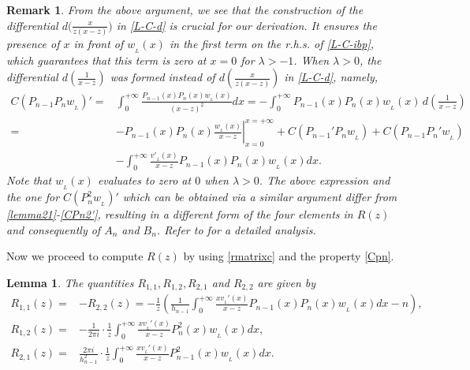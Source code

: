 \documentclass[12pt,a4paper]{article}    %
\newtheorem{lemma}[theorem]{Lemma}
\newtheorem{remark}{Remark}
\numberwithin{equation}{section}
\begin{document}
{\sloppy \begin{remark}\label{L-R2}
From the above argument, we see that the construction of  the differential $d\big(\frac{x}{z(x-z)}\big)$  in  \eqref{L-C-d} is crucial for our derivation. It ensures the presence of $x$ in front of $w_{_{L}}(x)$ in the first term on the r.h.s. of \eqref{L-C-ibp}, which guarantees that this term is zero at $x=0$ for $\lambda>-1$.
When $\lambda>0$, the differential $d\left(\frac{1}{x-z}\right)$ was formed \cite{WvA18} instead of $d\left(\frac{x}{z(x-z)}\right)$ in \eqref{L-C-d}, namely,
\begin{align*}
C\left(P_{n-1}P_nw_{_L}\right)'=&\int_{0}^{+\infty}\frac{P_{n-1}(x)P_{n}(x)w_{_L}(x)}{(x-z)^{2}}dx
=-\int_{0}^{+\infty}P_{n-1}(x)P_{n}(x)w_{_L}(x)\,d\left(\frac{1}{x-z}\right)\\
=&-\left.P_{n-1}(x)P_{n}(x)\frac{ w_{_L}(x)}{x-z}\right|_{x=0}^{x=+\infty}+ C(P_{n-1}'P_nw_{_L})+C(P_{n-1}P_n'w_{_L})\\
&-\int_0^{+\infty}\frac{v'_{_L}(x)}{x-z}P_{n-1}(x)P_n(x)w_{_L}(x)dx.
\end{align*}
Note that $w_{_L}(x)$ evaluates to zero at $0$ when $\lambda>0$. The above expression and the one for $C(P_{n}^{2}w_{_L})'$ which can be obtained via a similar argument differ from \eqref{lemma21}-\eqref{CPn2'}, resulting in a different form of the four elements in $R(z)$ and consequently of $A_n$ and $B_n$. Refer to \cite[Section 4.3]{WvA18} for a detailed analysis.
\end{remark}}	

Now we proceed to compute $R(z)$ by using \eqref{rmatrixc} and the property \eqref{Cpn}.
\begin{lemma}\label{R-L}
 The quantities $R_{1,1}, R_{1,2}, R_{2,1}$ and $ R_{2,2}$ are given by
	\begin{align}			 R_{1,1}(z)=&-R_{2,2}(z)=-\frac{1}{z}\left(\frac{1}{h_{n-1}}\int_{0}^{+\infty}\frac{xv_{_L}'(x)}{x-z}P_{n-1}(x)P_n(x)w_{_L}(x)dx-n\right),\label{R11}\\			 R_{1,2}(z)=&-\frac{1}{2\pi i}\cdot\frac{1}{z}\int_{0}^{+\infty}\frac{xv_{_L}'(x)}{x-z}P_n^{2}(x)w_{_L}(x)dx,\label{R12}\\
R_{2,1}(z)=&\frac{2\pi i}{h_{n-1}^{2}}\cdot \frac{1}{z}\int_{0}^{+\infty}\frac{xv_{_L}'(x)}{x-z}P_{n-1}^{2}(x)w_{_L}(x)dx.\label{r21}		 \end{align}
	\end{lemma}
	
\end{document}
